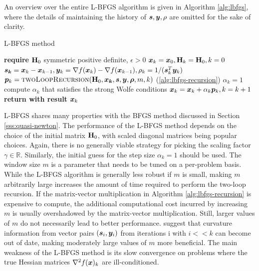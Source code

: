 An overview over the entire L-BFGS algorithm is given in Algorithm \ref{alg:lbfgs}, where the details of maintaining the history
of $\bm{s}, \bm{y}, \rho$ are omitted for the sake of clarity.

\begin{algorithm}
\caption{L-BFGS method}\label{alg:lbfgs}
\begin{algorithmic}
\State \textbf{require } $\mathbf{H}_0$ symmetric positive definite, $\epsilon > 0$
\State $\bm{x}_k = \bm{x}_0, \mathbf{H}_k = \mathbf{H}_0, k=0$
\State $\bm{s_k} = \bm{x}_k - \bm{x}_{k-1}, \bm{y}_k = \nabla f(\bm{x}_k) - \nabla f(\bm{x}_{k-1}), \rho_k = 1 / (\bm{s}^T_k \bm{y}_k)$
\State $\bm{p}_k = \text{\textsc{twoLoopRecursion}}(\mathbf{H}_0, \bm{x_k}, \bm{s}, \bm{y}, \bm{\rho}, m, k)$   (\cref{alg:lbfgs-recursion})
\State $\alpha_k = 1$
\State compute $\alpha_k$ that satisfies the strong Wolfe conditions
\EndIf
\State $\bm{x}_k = \bm{x}_k + \alpha_k \bm{p}_k, k = k + 1$
\EndWhile
\State \textbf{return with result } $\bm{x}_k$
\EndProcedure
\end{algorithmic}
\end{algorithm}

L-BFGS shares many properties with the BFGS method discussed in Section \ref{sss:quasi-newton}. The performance of the L-BFGS method depends 
on the choice of the initial matrix $\mathbf{H}_0$, with scaled diagonal matrices being popular choices. Again, there is no generally viable
strategy for picking the scaling factor $\gamma \in \mathbb{R}$. Similarly, the initial guess for the step size $\alpha_k=1$ should be used.
The window size $m$ is a parameter that needs to be tuned on a per-problem basis. While the L-BFGS algorithm is 
generally less robust if
$m$ is small, making $m$ arbitrarily large increases the amount of time required to perform the two-loop recursion. If the matrix-vector
multiplication in Algorithm \ref{alg:lbfgs-recursion} is expensive to compute, the additional computational cost incurred by increasing $m$ is 
usually overshadowed by the matrix-vector multiplication. Still, larger values of $m$ do not necessarily lead to better performance. 
\cite{liu2017} suggest that curvature information from vector pairs $(\bm{s}_i, \bm{y}_i)$ from iterations i with $i << k$ can become 
out of date, making moderately large values of $m$ more beneficial. The main weakness of the L-BFGS method is its slow convergence on 
problems where the true Hessian matrices $\nabla^2 f(\bm{x})_k$ are ill-conditioned.

